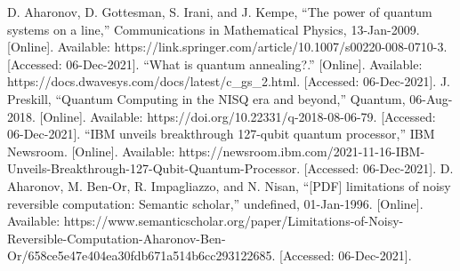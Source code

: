 \documentclass[conference]{IEEEtran}
\begin{document}
\begin{thebibliography}{00}
 D. Aharonov, D. Gottesman, S. Irani, and J. Kempe, “The power of quantum systems on a line,” Communications in Mathematical Physics, 13-Jan-2009. [Online]. Available: https://link.springer.com/article/10.1007/s00220-008-0710-3. [Accessed: 06-Dec-2021]. 
 “What is quantum annealing?.” [Online]. Available: https://docs.dwavesys.com/docs/latest/c\_gs\_2.html. [Accessed: 06-Dec-2021]. 
 J. Preskill, “Quantum Computing in the NISQ era and beyond,” Quantum, 06-Aug-2018. [Online]. Available: https://doi.org/10.22331/q-2018-08-06-79. [Accessed: 06-Dec-2021].
 “IBM unveils breakthrough 127-qubit quantum processor,” IBM Newsroom. [Online]. Available: https://newsroom.ibm.com/2021-11-16-IBM-Unveils-Breakthrough-127-Qubit-Quantum-Processor. [Accessed: 06-Dec-2021]. 
 D. Aharonov, M. Ben-Or, R. Impagliazzo, and N. Nisan, “[PDF] limitations of noisy reversible computation: Semantic scholar,” undefined, 01-Jan-1996. [Online]. Available: https://www.semanticscholar.org/paper/Limitations-of-Noisy-Reversible-Computation-Aharonov-Ben-Or/658ce5e47e404ea30fdb671a514b6cc293122685. [Accessed: 06-Dec-2021]. 
\end{thebibliography}
\end{document}
